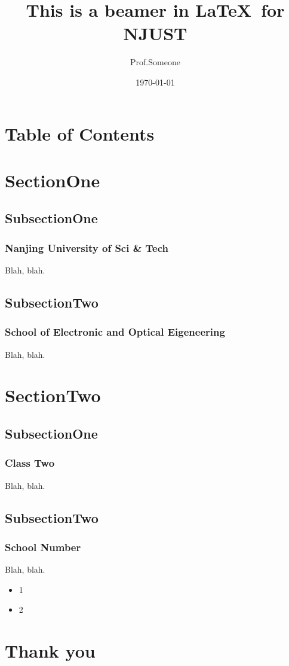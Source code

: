 \documentclass{beamer}
\begin{document}
	\title[]{\bf\LARGE{}This is a beamer in \LaTeX ~for NJUST}
	\author{Prof.Someone }
	\date{\today}

\begin{frame}
    \titlepage
\end{frame}	 
	
  \section*{Table of Contents}
  \frame {
	\frametitle{\secname}
	\tableofcontents
    }

  \section{SectionOne}

  \subsection{SubsectionOne}
   \begin{frame}
   \frametitle{ Nanjing University of Sci \& Tech}
    Blah, blah.
   \end{frame}

  \subsection{SubsectionTwo}
   \begin{frame}
   \frametitle{{School of Electronic and Optical Eigeneering}}
   Blah, blah.
   \end{frame}


  \section{	SectionTwo}
  
  \subsection{SubsectionOne}
  \begin{frame}
  \frametitle{Class Two}
   Blah, blah.
  \end{frame}

  \subsection{SubsectionTwo}
  \begin{frame}
  \frametitle{School Number}
  Blah, blah.
  \begin{itemize}
  	\item 1
  	\item 2
  \end{itemize}
  \end{frame}

  \section*{Thank you}
	 \frame{
	 \centering\Huge{\textcolor[RGB]{128,50,128}{Thank you!}}
 }
\end{document}
